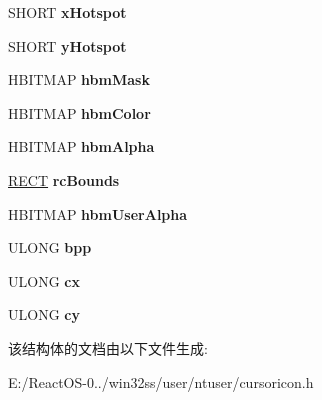 \begin{DoxyCompactItemize}
S\+H\+O\+RT {\bfseries x\+Hotspot}
\item 
\mbox{\label{struct___c_u_r_i_c_o_n___o_b_j_e_c_t_af021d979aad3e628a567a92ef63db521}} 
S\+H\+O\+RT {\bfseries y\+Hotspot}
\item 
\mbox{\label{struct___c_u_r_i_c_o_n___o_b_j_e_c_t_a6c2c95cfc4facf4dff9bbe44f7ed1883}} 
H\+B\+I\+T\+M\+AP {\bfseries hbm\+Mask}
\item 
\mbox{\label{struct___c_u_r_i_c_o_n___o_b_j_e_c_t_a3bd8b95f51953272991b0b1e33593490}} 
H\+B\+I\+T\+M\+AP {\bfseries hbm\+Color}
\item 
\mbox{\label{struct___c_u_r_i_c_o_n___o_b_j_e_c_t_afa57b004dab134c565c58a90dc882202}} 
H\+B\+I\+T\+M\+AP {\bfseries hbm\+Alpha}
\item 
\mbox{\label{struct___c_u_r_i_c_o_n___o_b_j_e_c_t_ac6d7ba21d2afa460eed7c004431d9aa2}} 
\hyperlink{structtag_r_e_c_t}{R\+E\+CT} {\bfseries rc\+Bounds}
\item 
\mbox{\label{struct___c_u_r_i_c_o_n___o_b_j_e_c_t_a700ede1302dd36f6cb911d62c1067e2f}} 
H\+B\+I\+T\+M\+AP {\bfseries hbm\+User\+Alpha}
\item 
\mbox{\label{struct___c_u_r_i_c_o_n___o_b_j_e_c_t_a18f3f0d8177c9da4de843febd84458bb}} 
U\+L\+O\+NG {\bfseries bpp}
\item 
\mbox{\label{struct___c_u_r_i_c_o_n___o_b_j_e_c_t_a292378a43d0a15cd891809c560b36d8e}} 
U\+L\+O\+NG {\bfseries cx}
\item 
\mbox{\label{struct___c_u_r_i_c_o_n___o_b_j_e_c_t_aecf12ab48a351c66b5dd0109a2aff0d5}} 
U\+L\+O\+NG {\bfseries cy}
\end{DoxyCompactItemize}


该结构体的文档由以下文件生成\+:\begin{DoxyCompactItemize}
\item 
E\+:/\+React\+O\+S-\/0../win32ss/user/ntuser/cursoricon.\+h\end{DoxyCompactItemize}
